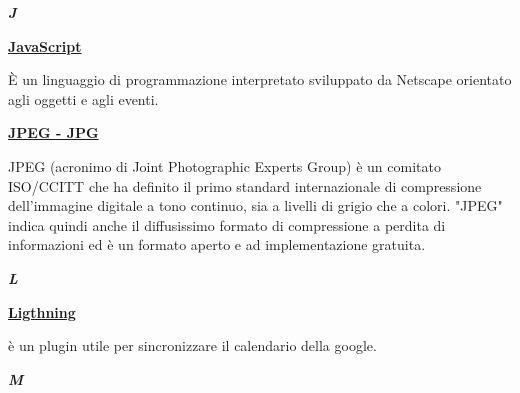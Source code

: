 \newpage

\cleardoublepage
{}
{}
\noindent\hrulefill\hspace{4mm}\textbf{\textsl{\Huge{J}}}\hspace{4mm}\hrulefill

\vspace*{2\bigskipamount}

\begin{addmargin}[0em]{0em}	
	\textbf{\underline{JavaScript}}
\end{addmargin}

\medskip
\begin{addmargin}[5em]{1em}
È un linguaggio di programmazione interpretato sviluppato da Netscape orientato agli oggetti e agli eventi.
\end{addmargin}
	
\bigskip
\begin{addmargin}[0em]{0em}	
	\textbf{\underline{JPEG - JPG}}
\end{addmargin}

\medskip
\begin{addmargin}[5em]{1em}
JPEG (acronimo di Joint Photographic Experts Group) è un comitato ISO/CCITT che ha definito il primo standard internazionale di compressione dell'immagine digitale a tono continuo, sia a livelli di grigio che a colori.
"JPEG" indica quindi anche il diffusissimo formato di compressione a perdita di informazioni ed è un formato aperto e ad implementazione gratuita.
\end{addmargin}	

\newpage

\cleardoublepage
{}
{}
\noindent\hrulefill\hspace{4mm}\textbf{\textsl{\Huge{L}}}\hspace{4mm}\hrulefill

\vspace*{2\bigskipamount}

\begin{addmargin}[0em]{0em}	
	\textbf{\underline{Ligthning}}
\end{addmargin}
	
\medskip
\begin{addmargin}[5em]{1em}	
è un plugin utile per sincronizzare il calendario della google.
\end{addmargin}

\newpage

\cleardoublepage
{}
{}
\noindent\hrulefill\hspace{4mm}\textbf{\textsl{\Huge{M}}}\hspace{4mm}\hrulefill


